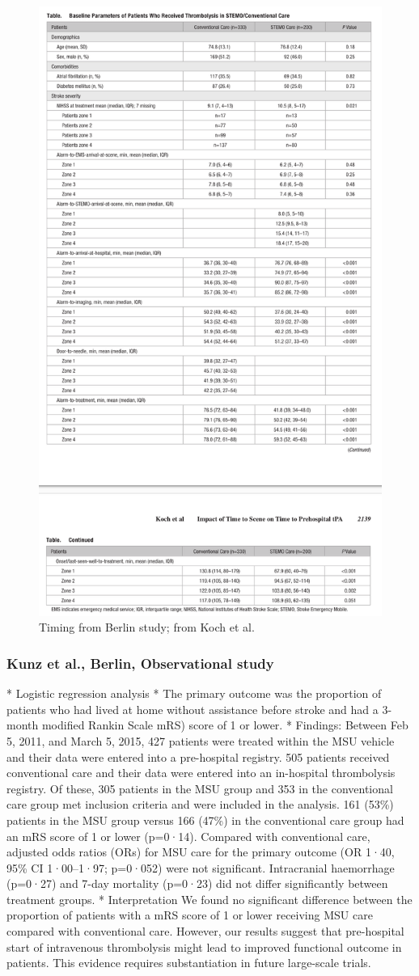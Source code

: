 \begin{figure}
    \centering
    \includegraphics[width=0.5\linewidth]{images_background/koch_timings.png}
    \caption{Timing from Berlin study; from Koch et al.}
    \label{fig:kock_timings}
\end{figure}

\subsubsection{Kunz et al., Berlin, Observational study \cite{kunz_functional_2016}}

* Logistic regression analysis
* The primary outcome was the proportion of patients who had lived at home without assistance before stroke and had a 3-month modiﬁed Rankin Scale mRS) score of 1 or lower.
* Findings:  Between Feb 5, 2011, and March 5, 2015, 427 patients were treated within the MSU vehicle and their data were entered into a pre-hospital registry. 505 patients received conventional care and their data were entered into an in-hospital thrombolysis registry. Of these, 305 patients in the MSU group and 353 in the conventional care group met inclusion criteria and were included in the analysis. 161 (53\%) patients in the MSU group versus 166 (47\%) in the conventional care group had an mRS score of 1 or lower (p=0·14). Compared with conventional care, adjusted odds ratios (ORs) for MSU care for the primary outcome (OR 1·40, 95\% CI 1·00–1·97; p=0·052) were not signiﬁcant. Intracranial haemorrhage (p=0·27) and 7-day mortality (p=0·23) did not diﬀer signiﬁcantly between treatment groups.
* Interpretation We found no signiﬁcant diﬀerence between the proportion of patients with a mRS score of 1 or lower receiving MSU care compared with conventional care. However, our results suggest that pre-hospital start of intravenous thrombolysis might lead to improved functional outcome in patients. This evidence requires substantiation in future large-scale trials.

